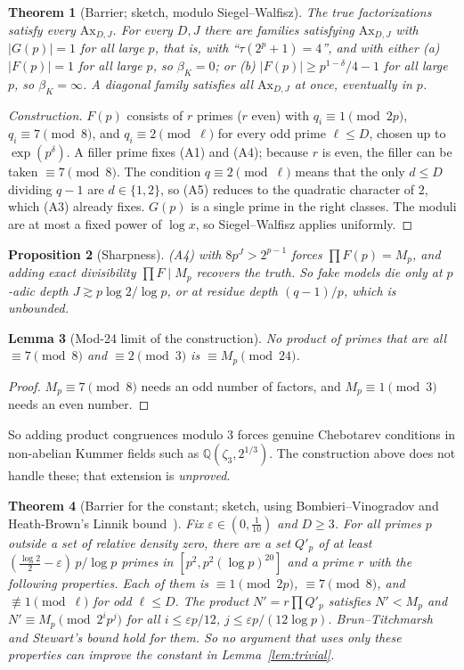 \documentclass[11pt]{amsart}
\newtheorem{theorem}{Theorem}[section]
\newtheorem{lemma}[theorem]{Lemma}
\newtheorem{proposition}[theorem]{Proposition}
\theoremstyle{definition}
\theoremstyle{remark}
\newcommand{\Q}{\mathbb{Q}}
\begin{document}
\begin{theorem}[Barrier; sketch, modulo Siegel--Walfisz]\label{thm:barrier}
The true factorizations satisfy every $\mathrm{Ax}_{D,J}$. For every $D,J$ there are families satisfying
$\mathrm{Ax}_{D,J}$ with $|G(p)|=1$ for all large $p$, that is, with ``$\tau(2^p+1)=4$'', and with either
(a) $|F(p)|=1$ for all large $p$, so $\beta_K=0$; or
(b) $|F(p)|\ge p^{1-\delta}/4-1$ for all large $p$, so $\beta_K=\infty$.
A diagonal family satisfies all $\mathrm{Ax}_{D,J}$ at once, eventually in $p$.
\end{theorem}
\begin{proof}[Construction]
$F(p)$ consists of $r$ primes ($r$ even) with $q_i\equiv1\pmod{2p}$, $q_i\equiv7\pmod8$, and
$q_i\equiv2\pmod\ell$ for every odd prime $\ell\le D$, chosen up to $\exp(p^\delta)$. A filler prime fixes (A1)
and (A4); because $r$ is even, the filler can be taken $\equiv7\pmod 8$. The condition $q\equiv2\pmod\ell$ means that
the only $d\le D$ dividing $q-1$ are $d\in\{1,2\}$, so (A5) reduces to the quadratic character of $2$, which (A3)
already fixes. $G(p)$ is a single prime in the right classes. The moduli are at most a fixed power of $\log x$, so
Siegel--Walfisz applies uniformly.
\end{proof}

\begin{proposition}[Sharpness]
(A4) with $8p^J>2^{p-1}$ forces $\prod F(p)=M_p$, and adding exact divisibility $\prod F\mid M_p$ recovers the truth.
So fake models die only at $p$-adic depth $J\gtrsim p\log2/\log p$, or at residue depth $(q-1)/p$, which is unbounded.
\end{proposition}

\begin{lemma}[Mod-24 limit of the construction]
No product of primes that are all $\equiv7\pmod 8$ and $\equiv2\pmod3$ is $\equiv M_p\pmod{24}$.
\end{lemma}
\begin{proof}
$M_p\equiv7\pmod8$ needs an odd number of factors, and $M_p\equiv1\pmod3$ needs an even number.
\end{proof}
So adding product congruences modulo $3$ forces genuine Chebotarev conditions in non-abelian Kummer fields such as
$\Q(\zeta_3,2^{1/3})$. The construction above does not handle these; that extension is \emph{unproved}.

\begin{theorem}[Barrier for the constant; sketch, using Bombieri--Vinogradov and Heath-Brown's Linnik bound~\cite{HB92}]
\label{thm:constbarrier}
Fix $\varepsilon\in(0,\frac1{10})$ and $D\ge3$. For all primes $p$ outside a set of relative density zero, there are a set
$Q'_p$ of at least $(\frac{\log2}2-\varepsilon)\,p/\log p$ primes in $[p^2,p^2(\log p)^{20}]$ and a prime $r$ with the
following properties. Each of them is $\equiv1\pmod{2p}$, $\equiv7\pmod8$, and $\not\equiv1\pmod\ell$ for odd $\ell\le D$.
The product $N'=r\prod Q'_p$ satisfies $N'<M_p$ and $N'\equiv M_p\pmod{2^ip^j}$ for all $i\le\varepsilon p/12$,
$j\le\varepsilon p/(12\log p)$. Brun--Titchmarsh and Stewart's bound hold for them. So no argument that uses only these
properties can improve the constant in Lemma~\ref{lem:trivial}.
\end{theorem}
\end{document}
